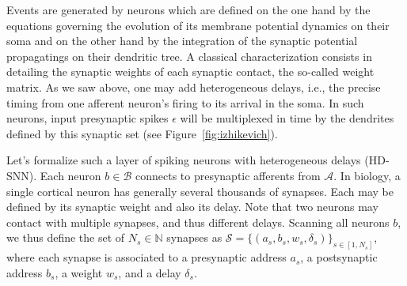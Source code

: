 \documentclass[runningheads]{llncs}
\newcommand{\presynaddr}{a} %
\newcommand{\postsynaddr}{b} %
\newcommand{\presynaddrspace}{\mathcal{A}} %
\newcommand{\postsynaddrspace}{\mathcal{B}} %
\newcommand{\synapse}{\mathcal{S}} %
\newcommand{\synapticweight}{w} %
\newcommand{\synapticdelay}{\delta} %
\newcommand{\ranksyn}{s} %
\newcommand{\Nsyn}{N_{s}} %
\newcommand{\event}{\epsilon} %
\begin{document}
Events are generated by neurons which are defined on the one hand by the equations governing the evolution of its membrane potential dynamics on their soma and on the other hand by the integration of the synaptic potential propagatings on their dendritic tree. A classical characterization consists in detailing the synaptic weights of each synaptic contact, the so-called weight matrix. As we saw above, one may add heterogeneous delays, i.e., the precise timing from one afferent neuron's firing to its arrival in the soma. %
In such neurons, %
input presynaptic spikes $\event$ will be multiplexed in time by the dendrites defined by this synaptic set (see Figure~\ref{fig:izhikevich}). %

Let's formalize such a layer of spiking neurons with heterogeneous delays (HD-SNN). Each neuron $\postsynaddr \in \postsynaddrspace$  connects to presynaptic afferents from $\presynaddrspace$. In biology, a single cortical neuron has generally several thousands of synapses. Each may be defined by its synaptic weight and also its delay. %
Note that two neurons may contact with multiple synapses, and thus different delays. Scanning all neurons $\postsynaddr$, we thus define the set of $\Nsyn \in \mathbb{N}$ synapses  as  $\synapse = \{(\presynaddr_\ranksyn, \postsynaddr_\ranksyn, \synapticweight_\ranksyn, \synapticdelay_\ranksyn)\}_{\ranksyn \in [1,\Nsyn]}$, where each synapse is associated to a presynaptic address $\presynaddr_\ranksyn$, a postsynaptic address $\postsynaddr_\ranksyn$,  a weight $\synapticweight_\ranksyn$, and a delay $\synapticdelay_\ranksyn$. 
\end{document}
